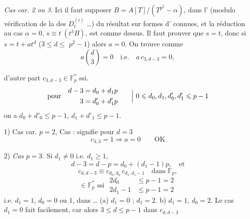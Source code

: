 \documentclass[11pt,a4paper]{article}
\begin{document}
\emph{Cas car. 2 ou 3}. Ici il faut supposer $B = A[T]/(T^{p^{2}} - \alpha)$, dans l' (modulo vérification de la   des $D^{(i)}_{t}$ …) du résultat sur formes d' connues, et la réduction au cas $\alpha = 0$, $s \equiv t \ (t^{3}B)$, est comme dessus. Il faut prouver que $s = t$, donc si $s = t + a t^{d}$ ($3 \leqslant d \leqslant$ \struck{\ill{}} $p^{2}-1$) alors $a = 0$. On trouve comme 
\[
a\binom{d}{3} = 0 \quad\text{i.e.}\quad a\, c_{3,d-3} = 0,
\]

d'autre part $c_{3,d-3} \in \mathbb{F}_p^{*}$ ssi. 
\[
\text{pour}\quad
\begin{aligned}
d-3 &= d_0 + d_1 p\\
3 &= d'_0 + d'_1 p
\end{aligned}
\qquad \Bigl|\ 0 \leqslant d_0, d_1, d'_0, d'_1 \leqslant p-1
\]
on a $d_0 + d'_0 \leqslant p-1$, $d_1 + d'_1 \leqslant p-1$.

1) Cas car. $p = 2$,   Cas : signifie \struck{\ill{}} pour $d = 3$ \struck{\ill{}}
\[
c_{3,3} = 1 \Longrightarrow a = 0 \qquad \text{OK}
\]
\struck{\ill{}}

2) \emph{Cas $p = 3$.} \struck{\ill{}} Si $d_1 \neq 0$ i.e. $d_1 \geqslant 1$,
\[
d - 3 = d - p = d_0 + (d_1 - 1)p, \quad\text{et}
\]
\[
c_{d,d-3} \equiv c_{d_0,d_0}\, c_{d_1,d_1-1} \quad \text{dans } \mathbb{F}_p,
\]
\[
\in \mathbb{F}_p^{*} \text{ ssi }
\begin{aligned}
2d_0 &\leqslant p-1 = 2\\
2d_1 - 1 &\leqslant p-1 = 2
\end{aligned}
\]
i.e. $d_1 = 1$, $d_0 = 0$ ou $1$, dans  …
(a) $d_1 = 0$ ;  $d_1 = 2$. b) $d_1 = 1$, $d_0 = 2$. \struck{\ill{}} Le cas $d_1 = 0$  fait facilement, car alors $3 \leqslant d \leqslant p-1$ dans $c_{d,d-3}$

\end{document}
